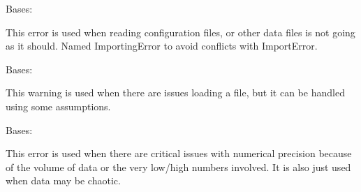 \documentclass[letterpaper,10pt,english]{sphinxmanual}
\begin{document}

\begin{fulllineitems}
\label{\detokenize{docstrings/ifa_smeargle.core.error:ifa_smeargle.core.error.ImportingError}}
Bases: {\hyperref[\detokenize{docstrings/ifa_smeargle.core.error:ifa_smeargle.core.error.Ifas_Exception}]{}}

This error is used when reading configuration files, or other
data files is not going as it should. Named ImportingError to
avoid conflicts with ImportError.

\end{fulllineitems}


\begin{fulllineitems}
\label{\detokenize{docstrings/ifa_smeargle.core.error:ifa_smeargle.core.error.ImportingWarning}}
Bases: {\hyperref[\detokenize{docstrings/ifa_smeargle.core.error:ifa_smeargle.core.error.Ifas_Warning}]{}}

This warning is used when there are issues loading a file, but
it can be handled using some assumptions.

\end{fulllineitems}


\begin{fulllineitems}
\label{\detokenize{docstrings/ifa_smeargle.core.error:ifa_smeargle.core.error.ImprecisionError}}
Bases: {\hyperref[\detokenize{docstrings/ifa_smeargle.core.error:ifa_smeargle.core.error.Ifas_Exception}]{}}

This error is used when there are critical issues with numerical
precision because of the volume of data or the very low/high
numbers involved. It is also just used when data may be chaotic.

\end{fulllineitems}
\end{document}
